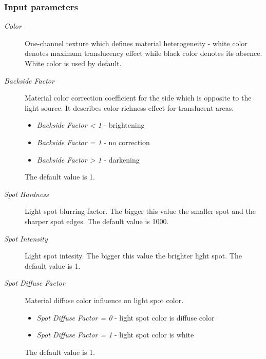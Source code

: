 \documentclass[a4paper,12pt,oneside]{sphinxmanual}
\begin{document}
\subsubsection{Input parameters}
\label{node_materials:id6}\begin{description}
\item[{\emph{Color}}] \leavevmode
One-channel texture which defines material heterogeneity - white color denotes maximum translucency effect while black color denotes its absence. White color is used by default.

\item[{\emph{Backside Factor}}] \leavevmode
Material color correction coefficient for the side which is opposite to the light source. It describes color richness effect for translucent areas.
\begin{itemize}
\item {} 
\emph{Backside Factor \textless{} 1} - brightening

\item {} 
\emph{Backside Factor = 1} - no correction

\item {} 
\emph{Backside Factor \textgreater{} 1} - darkening

\end{itemize}

The default value is 1.

\item[{\emph{Spot Hardness}}] \leavevmode
Light spot blurring factor. The bigger this value the smaller spot and the sharper spot edges. The default value is 1000.

\item[{\emph{Spot Intensity}}] \leavevmode
Light spot intesity. The bigger this value the brighter light spot. The default value is 1.

\item[{\emph{Spot Diffuse Factor}}] \leavevmode
Material diffuse color influence on light spot color.
\begin{itemize}
\item {} 
\emph{Spot Diffuse Factor = 0} - light spot color is diffuse color

\item {} 
\emph{Spot Diffuse Factor = 1} - light spot color is white

\end{itemize}

The default value is 1.

\end{description}
\end{document}

